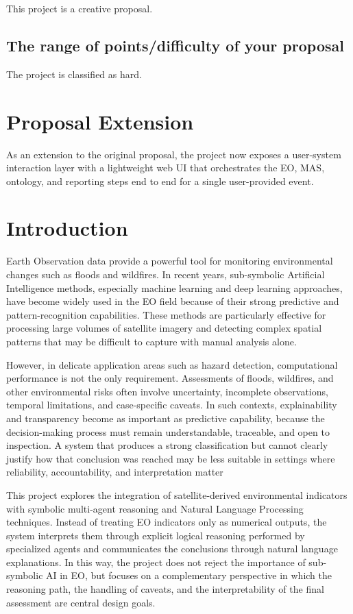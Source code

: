 \documentclass[12pt]{article}
\begin{document}
This project is a creative proposal.

\subsection{The range of points/difficulty of your proposal}
\label{subsec:points}

The project is classified as hard.

\section{Proposal Extension}

As an extension to the original proposal, the project now exposes a user-system interaction layer with a lightweight web UI that orchestrates the EO, MAS, ontology, and reporting steps end to end for a single user-provided event.

\section{Introduction}
\label{sec:intro}
Earth Observation data provide a powerful tool for monitoring environmental changes such as floods and wildfires. In recent years, sub-symbolic Artificial Intelligence methods, especially machine learning and deep learning approaches, have become widely used in the EO field because of their strong predictive and pattern-recognition capabilities. These methods are particularly effective for processing large volumes of satellite imagery and detecting complex spatial patterns that may be difficult to capture with manual analysis alone.

However, in delicate application areas such as hazard detection, computational performance is not the only requirement. Assessments of floods, wildfires, and other environmental risks often involve uncertainty, incomplete observations, temporal limitations, and case-specific caveats. In such contexts, explainability and transparency become as important as predictive capability, because the decision-making process must remain understandable, traceable, and open to inspection. A system that produces a strong classification but cannot clearly justify how that conclusion was reached may be less suitable in settings where reliability, accountability, and interpretation matter

This project  explores the integration of satellite-derived environmental indicators with symbolic multi-agent reasoning and Natural Language Processing techniques. Instead of treating EO indicators only as numerical outputs, the system interprets them through explicit logical reasoning performed by specialized agents and communicates the conclusions through natural language explanations. In this way, the project does not reject the importance of sub-symbolic AI in EO, but focuses on a complementary perspective in which the reasoning path, the handling of caveats, and the interpretability of the final assessment are central design goals.
\end{document}
